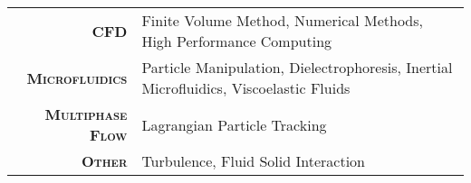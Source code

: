 
\vspace{10pt}

\begin{tabular}{rl}
  \textsc{\textbf{CFD}}             & Finite Volume Method, Numerical Methods, High Performance Computing \\
  \textsc{\textbf{Microfluidics}}   & Particle Manipulation, Dielectrophoresis, Inertial Microfluidics, Viscoelastic Fluids \\
  \textsc{\textbf{Multiphase Flow}} & Lagrangian Particle Tracking \\
  \textsc{\textbf{Other}}           & Turbulence, Fluid Solid Interaction
\end{tabular}
